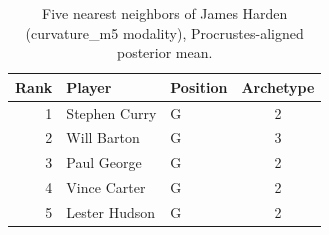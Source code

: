 \begin{table}[htbp]
  \centering\small
  \begin{tabular}{rllc}
    \toprule
    Rank & Player & Position & Archetype \\
    \midrule
    1 & Stephen Curry & G & 2 \\
    2 & Will Barton & G & 3 \\
    3 & Paul George & G & 2 \\
    4 & Vince Carter & G & 2 \\
    5 & Lester Hudson & G & 2 \\
    \bottomrule
  \end{tabular}
  \caption{Five nearest neighbors of James Harden (curvature_m5 modality), Procrustes-aligned posterior mean.}
  \label{tab:James_Harden_neighbors_curvature_m5}
\end{table}

